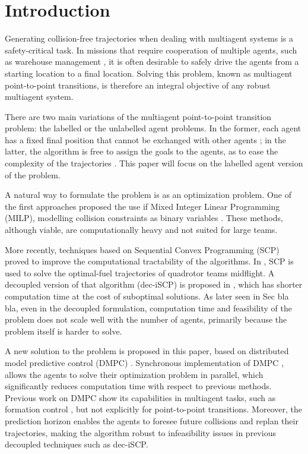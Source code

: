 \section{Introduction}
\label{sec:introduction}
Generating collision-free trajectories when dealing with multiagent systems is a safety-critical task. In missions that require cooperation of multiple agents, such as warehouse management \cite{guizzo2008three}, it is often desirable to safely drive the agents from a starting location to a final location. Solving this problem, known as multiagent point-to-point transitions, is therefore an integral objective of any robust multiagent system.

There are two main variations of the multiagent point-to-point transition problem: the labelled or the unlabelled agent problems. In the former, each agent has a fixed final position that cannot be exchanged with other agents \cite{schouwenaars2001mixed, augugliaro2012generation}; in the latter, the algorithm is free to assign the goals to the agents, as to ease the complexity of the trajectories \cite{turpin2012decentralized}. This paper will focus on the labelled agent version of the problem. 

A natural way to formulate the problem is as an optimization problem. One of the first approaches proposed the use if Mixed Integer Linear Programming (MILP), modelling collision constraints as binary variables \cite{schouwenaars2001mixed}. These methods, although viable, are computationally heavy and not suited for large teams.

More recently, techniques based on Sequential Convex Programming (SCP) \cite{boyd2008sequential}  proved to improve the computational tractability of the algorithms. In \cite{augugliaro2012generation}, SCP is used to solve the optimal-fuel trajectories of quadrotor teams midflight. A decoupled version of that algorithm (dec-iSCP) is proposed in \cite{chen2015decoupled}, which has shorter computation time at the cost of suboptimal solutions. As later seen in Sec bla bla, even in the decoupled formulation, computation time and feasibility of the problem does not scale well with the number of agents, primarily because the problem itself is harder to solve. 

A new solution to the problem is proposed in this paper, based on distributed model predictive control (DMPC) \cite{camponogara2002distributed}. Synchronous implementation of DMPC \cite{dai2017distributed}, allows the agents to solve their optimization problem in parallel, which significantly reduces computation time with respect to previous methods. Previous work on DMPC show its capabilities in multiagent tasks, such as formation control \cite{van2017distributed,turpin2012decentralized}, but not explicitly for point-to-point transitions. Moreover, the prediction horizon enables the agents to foresee future collisions and replan their trajectories, making the algorithm robust to infeasibility issues in previous decoupled techniques such as dec-iSCP.

